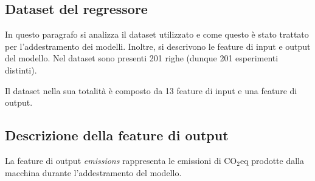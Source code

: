 \subsection {Dataset del regressore}
In questo paragrafo si analizza il dataset utilizzato e come questo è stato trattato per l'addestramento dei modelli. Inoltre, si descrivono le feature di input e output del modello.
Nel dataset sono presenti 201 righe (dunque 201 esperimenti distinti).

\noindent Il dataset nella sua totalità è composto da 13 feature di input e una feature di output.
\subsection{Descrizione della feature di output}
La feature di output \textit{emissions} rappresenta le emissioni di CO$_2$eq prodotte dalla macchina durante l'addestramento del modello.
